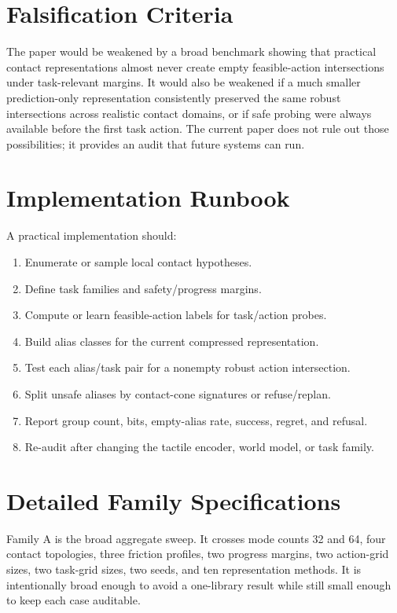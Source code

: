 \documentclass{article}
\begin{document}
\section{Falsification Criteria}
The paper would be weakened by a broad benchmark showing that practical contact representations almost never create empty feasible-action intersections under task-relevant margins. It would also be weakened if a much smaller prediction-only representation consistently preserved the same robust intersections across realistic contact domains, or if safe probing were always available before the first task action. The current paper does not rule out those possibilities; it provides an audit that future systems can run.

\section{Implementation Runbook}
A practical implementation should:
\begin{enumerate}[leftmargin=*]
\item Enumerate or sample local contact hypotheses.
\item Define task families and safety/progress margins.
\item Compute or learn feasible-action labels for task/action probes.
\item Build alias classes for the current compressed representation.
\item Test each alias/task pair for a nonempty robust action intersection.
\item Split unsafe aliases by contact-cone signatures or refuse/replan.
\item Report group count, bits, empty-alias rate, success, regret, and refusal.
\item Re-audit after changing the tactile encoder, world model, or task family.
\end{enumerate}

\section{Detailed Family Specifications}
Family A is the broad aggregate sweep. It crosses mode counts 32 and 64, four contact topologies, three friction profiles, two progress margins, two action-grid sizes, two task-grid sizes, two seeds, and ten representation methods. It is intentionally broad enough to avoid a one-library result while still small enough to keep each case auditable.
\end{document}
